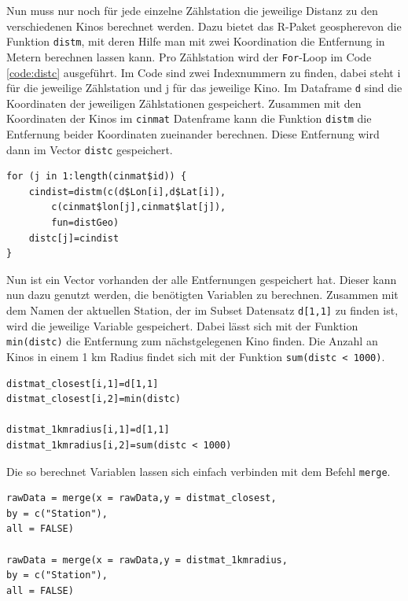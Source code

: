 \documentclass[a4paper,12pt]{thesis}
\begin{document}
Nun muss nur noch für jede einzelne Zählstation die jeweilige Distanz zu den verschiedenen Kinos berechnet werden. Dazu bietet das R-Paket \glqq geosphere\grqq von \cite{Hijmans2021} die Funktion \lstinline|distm|, mit deren Hilfe man mit zwei Koordination die Entfernung in Metern berechnen lassen kann. Pro Zählstation wird der \lstinline|For|-Loop im Code \ref{code:distc} ausgeführt. Im Code sind zwei Indexnummern zu finden, dabei steht i für die jeweilige Zählstation und j für das jeweilige Kino. Im Dataframe \lstinline|d| sind die Koordinaten der jeweiligen Zählstationen gespeichert. Zusammen mit den Koordinaten der Kinos im \lstinline|cinmat| Datenframe kann die Funktion \lstinline|distm| die Entfernung beider Koordinaten zueinander berechnen. Diese Entfernung wird dann im Vector \lstinline|distc| gespeichert.

\begin{minipage}{\linewidth}
\begin{lstlisting}[caption={Berechnung der Entfernung},label=code:distc]
for (j in 1:length(cinmat$id)) {
	cindist=distm(c(d$Lon[i],d$Lat[i]),
		c(cinmat$lon[j],cinmat$lat[j]), 
		fun=distGeo)
	distc[j]=cindist
}
\end{lstlisting}
\end{minipage}

Nun ist ein Vector vorhanden der alle Entfernungen gespeichert hat. Dieser kann nun dazu genutzt werden, die benötigten Variablen zu berechnen. Zusammen mit dem Namen der aktuellen Station, der im Subset Datensatz \lstinline|d[1,1]| zu finden ist, wird die jeweilige Variable gespeichert. Dabei lässt sich mit der Funktion \lstinline|min(distc)| die Entfernung zum nächstgelegenen Kino finden. Die Anzahl an Kinos in einem 1 km Radius findet sich mit der Funktion \lstinline|sum(distc < 1000)|.

\begin{minipage}{\linewidth}
\begin{lstlisting}[caption={Berechnung der Entfernungsvariablen},label=code:dist_variables]
distmat_closest[i,1]=d[1,1]
distmat_closest[i,2]=min(distc)

distmat_1kmradius[i,1]=d[1,1]
distmat_1kmradius[i,2]=sum(distc < 1000)
\end{lstlisting}
\end{minipage}

Die so berechnet Variablen lassen sich einfach verbinden mit dem Befehl \lstinline|merge|.

\begin{minipage}{\linewidth}
\begin{lstlisting}[caption={Füge neue Variablen dem Datensatz hinzu},label=code:dist_variables2]
rawData = merge(x = rawData,y = distmat_closest,
by = c("Station"),
all = FALSE)

rawData = merge(x = rawData,y = distmat_1kmradius,
by = c("Station"),
all = FALSE)
\end{lstlisting}
\end{minipage}
\end{document}
